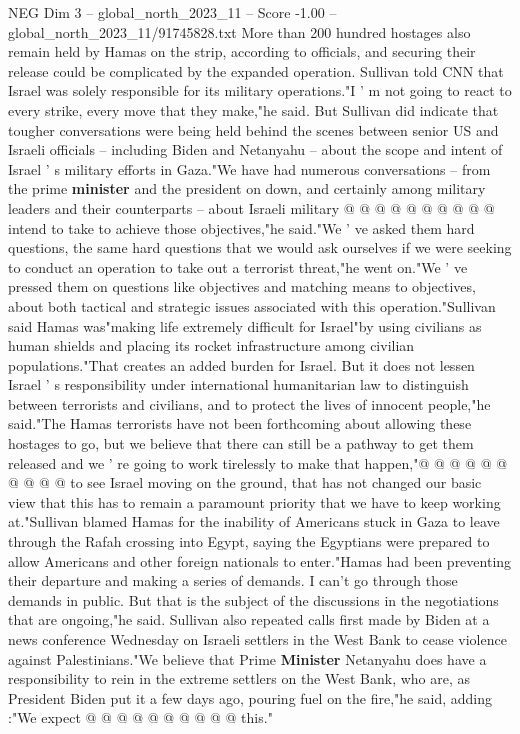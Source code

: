 \begin{textsample}{NEG Dim 3 – global\_north\_2023\_11 – Score -1.00 – global\_north\_2023\_11/91745828.txt}
More than 200 hundred hostages also remain held by Hamas on the strip, according to officials, and securing their release could be complicated by the expanded operation.
Sullivan told CNN that Israel was solely responsible for its military operations."I ' m not going to react to every strike, every move that they make,"he said.
But Sullivan did indicate that tougher conversations were being held behind the scenes between senior US and Israeli officials -- including Biden and Netanyahu -- about the scope and intent of Israel ' s military efforts in Gaza."We have had numerous conversations -- from the prime \textbf{minister} and the president on down, and certainly among military leaders and their counterparts -- about Israeli military @ @ @ @ @ @ @ @ @ @ intend to take to achieve those objectives,"he said."We ' ve asked them hard questions, the same hard questions that we would ask ourselves if we were seeking to conduct an operation to take out a terrorist threat,"he went on."We ' ve pressed them on questions like objectives and matching means to objectives, about both tactical and strategic issues associated with this operation."Sullivan said Hamas was"making life extremely difficult for Israel"by using civilians as human shields and placing its rocket infrastructure among civilian populations."That creates an added burden for Israel.
But it does not lessen Israel ' s responsibility under international humanitarian law to distinguish between terrorists and civilians, and to protect the lives of innocent people,"he said."The Hamas terrorists have not been forthcoming about allowing these hostages to go, but we believe that there can still be a pathway to get them released and we ' re going to work tirelessly to make that happen,"@ @ @ @ @ @ @ @ @ @ to see Israel moving on the ground, that has not changed our basic view that this has to remain a paramount priority that we have to keep working at."Sullivan blamed Hamas for the inability of Americans stuck in Gaza to leave through the Rafah crossing into Egypt, saying the Egyptians were prepared to allow Americans and other foreign nationals to enter."Hamas had been preventing their departure and making a series of demands.
I can't go through those demands in public.
But that is the subject of the discussions in the negotiations that are ongoing,"he said.
Sullivan also repeated calls first made by Biden at a news conference Wednesday on Israeli settlers in the West Bank to cease violence against Palestinians."We believe that Prime \textbf{Minister} Netanyahu does have a responsibility to rein in the extreme settlers on the West Bank, who are, as President Biden put it a few days ago, pouring fuel on the fire,"he said, adding :"We expect @ @ @ @ @ @ @ @ @ @ this."

\end{textsample}

